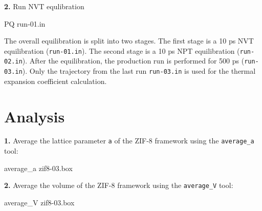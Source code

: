 \documentclass[
  letterpaper,
  DIV=11,
  numbers=noendperiod]{scrreprt}
\newenvironment{Shaded}{\begin{snugshade}}{\end{snugshade}}
\newcommand{\ExtensionTok}[1]{\textcolor[rgb]{0.00,0.23,0.31}{#1}}
\newcommand{\NormalTok}[1]{\textcolor[rgb]{0.00,0.23,0.31}{#1}}
\begin{document}
\textbf{2.} Run NVT equlibration

\begin{Shaded}
\begin{Highlighting}[]
\ExtensionTok{PQ}\NormalTok{ run{-}01.in}
\end{Highlighting}
\end{Shaded}

\begin{tcolorbox}[enhanced jigsaw, title=\textcolor{quarto-callout-note-color}{\faInfo}\hspace{0.5em}{Note}, colbacktitle=quarto-callout-note-color!10!white, bottomtitle=1mm, breakable, colframe=quarto-callout-note-color-frame, toprule=.15mm, opacitybacktitle=0.6, bottomrule=.15mm, titlerule=0mm, arc=.35mm, rightrule=.15mm, toptitle=1mm, coltitle=black, left=2mm, opacityback=0, colback=white, leftrule=.75mm]

The overall equilibration is split into two stages. The first stage is a
10 ps NVT equilibration (\texttt{run-01.in}). The second stage is a 10
ps NPT equilibration (\texttt{run-02.in}). After the equilibration, the
production run is performed for 500 ps (\texttt{run-03.in}). Only the
trajectory from the last run \texttt{run-03.in} is used for the thermal
expansion coefficient calculation.

\end{tcolorbox}

\hypertarget{analysis}{%
\section*{Analysis}\label{analysis}}


\textbf{1.} Average the lattice parameter \texttt{a} of the ZIF-8
framework using the \texttt{average\_a} tool:

\begin{Shaded}
\begin{Highlighting}[]
\ExtensionTok{average\_a}\NormalTok{ zif8{-}03.box}
\end{Highlighting}
\end{Shaded}

\textbf{2.} Average the volume of the ZIF-8 framework using the
\texttt{average\_V} tool:

\begin{Shaded}
\begin{Highlighting}[]
\ExtensionTok{average\_V}\NormalTok{ zif8{-}03.box}
\end{Highlighting}
\end{Shaded}
\end{document}
